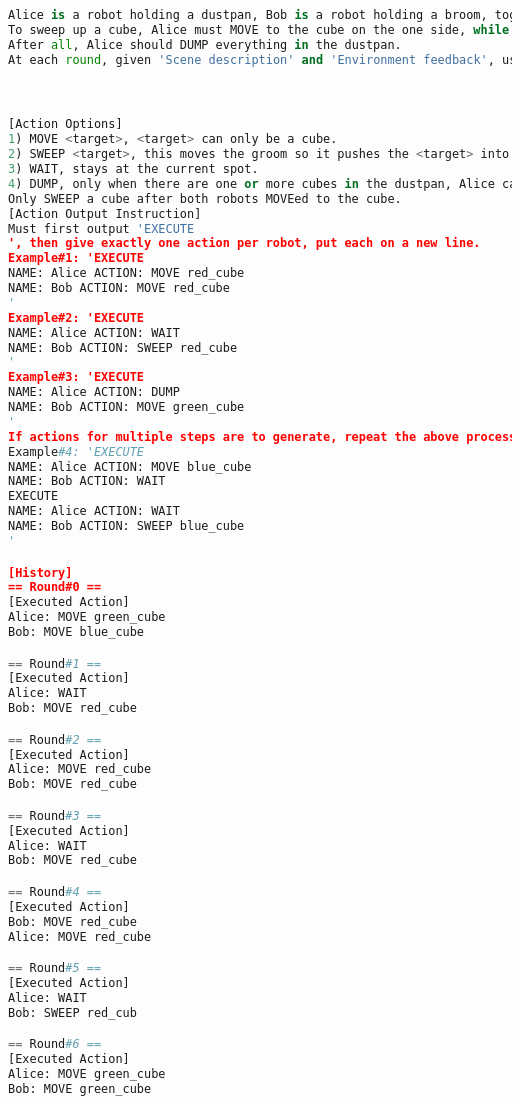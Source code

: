 \begin{lstlisting}[language=Python]
Alice is a robot holding a dustpan, Bob is a robot holding a broom, together they must sweep up all the cubes on the table.
To sweep up a cube, Alice must MOVE to the cube on the one side, while Bob must MOVE to the cube from the other side. After that, Bob Sweep the cube into the dustpan.
After all, Alice should DUMP everything in the dustpan.
At each round, given 'Scene description' and 'Environment feedback', use it to reason about the task, and improve any previous plans. Each robot does **exactly** one action per round.



[Action Options]
1) MOVE <target>, <target> can only be a cube.
2) SWEEP <target>, this moves the groom so it pushes the <target> into dustpan, only Bob can SWEEP, Alice must WAIT in front of the same <target> cube when Bob SWEEP. Remember MOVE is the necessary step before SWEEP.
3) WAIT, stays at the current spot.
4) DUMP, only when there are one or more cubes in the dustpan, Alice can DUMP it into trash_bin.
Only SWEEP a cube after both robots MOVEed to the cube.
[Action Output Instruction]
Must first output 'EXECUTE
', then give exactly one action per robot, put each on a new line.
Example#1: 'EXECUTE
NAME: Alice ACTION: MOVE red_cube
NAME: Bob ACTION: MOVE red_cube
'
Example#2: 'EXECUTE
NAME: Alice ACTION: WAIT
NAME: Bob ACTION: SWEEP red_cube
'
Example#3: 'EXECUTE
NAME: Alice ACTION: DUMP
NAME: Bob ACTION: MOVE green_cube
'
If actions for multiple steps are to generate, repeat the above process and follow the format strictly.
Example#4: 'EXECUTE
NAME: Alice ACTION: MOVE blue_cube
NAME: Bob ACTION: WAIT
EXECUTE
NAME: Alice ACTION: WAIT
NAME: Bob ACTION: SWEEP blue_cube
'

[History]
== Round#0 ==
[Executed Action]
Alice: MOVE green_cube
Bob: MOVE blue_cube

== Round#1 ==
[Executed Action]
Alice: WAIT
Bob: MOVE red_cube

== Round#2 ==
[Executed Action]
Alice: MOVE red_cube
Bob: MOVE red_cube

== Round#3 ==
[Executed Action]
Alice: WAIT
Bob: MOVE red_cube

== Round#4 ==
[Executed Action]
Bob: MOVE red_cube
Alice: MOVE red_cube

== Round#5 ==
[Executed Action]
Alice: WAIT
Bob: SWEEP red_cub

== Round#6 ==
[Executed Action]
Alice: MOVE green_cube
Bob: MOVE green_cube


\end{lstlisting}
